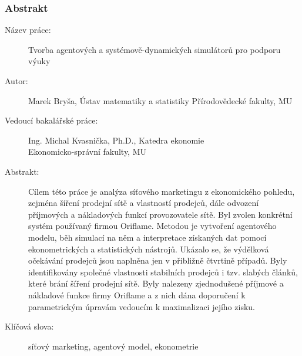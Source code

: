 \documentclass[a4wide,12pt]{report}
\begin{document}
\subsubsection{\large Abstrakt}
\begin{description}
\item[Název práce:] Tvorba agentových a systémově-dynamických simulátorů pro podporu výuky
\item[Autor:] Marek Bryša, Ústav matematiky a statistiky Přírodovědecké fakulty, MU
\item[Vedoucí bakalářské práce:] Ing. Michal Kvasnička, Ph.D., Katedra ekonomie\\ Ekonomicko-správní fakulty, MU
\item[Abstrakt:] Cílem této práce je analýza síťového marketingu z ekonomického pohledu, zejména šíření prodejní sítě a vlastností prodejců, dále odvození příjmových a nákladových funkcí provozovatele sítě. Byl zvolen konkrétní systém používaný firmou Oriflame. Metodou je vytvoření agentového modelu, běh simulací na něm a interpretace získaných dat pomocí ekonometrických a statistických nástrojů. Ukázalo se, že výdělková očekávání prodejců jsou naplněna jen v přibližně čtvrtině případů. Byly identifikovány společné vlastnosti stabilních prodejců i tzv. slabých článků, které brání šíření prodejní sítě. Byly nalezeny zjednodušené příjmové a nákladové funkce firmy Oriflame a z nich dána doporučení k parametrickým úpravám vedoucím k maximalizaci jejího zisku.
\item[Klíčová slova:] síťový marketing, agentový model, ekonometrie
\end{description}
\end{document}
